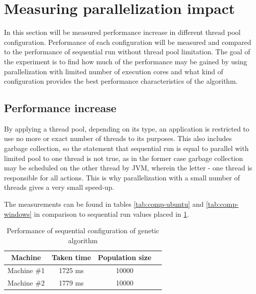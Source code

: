 \section{Measuring parallelization impact}

In this section will be measured performance increase in different thread pool configuration.
Performance of each configuration will be measured and compared to the performance of sequential run without thread pool limitation. The goal of the experiment is to find how much of the performance may be gained by using parallelization with limited number of execution cores and  what kind of configuration provides the best performance characteristics of the algorithm.

\subsection{Performance increase}

By applying a thread pool, depending on its type, an application is restricted to use no more or exact number of threads to its purposes. This also includes garbage collection, so the statement that sequential run is equal to parallel with limited pool to one thread is not true, as in the former case garbage collection may be scheduled on the other thread by JVM, wherein the letter - one thread is responsible for all actions. This is why parallelization with a small number of threads gives a very small speed-up.

The measurements can be found in tables \ref{tab:comp-ubuntu} and \ref{tab:comp-windows} in comparison to sequential run values placed in \ref{tab:win-ub-perf}.

\begin{table}[h]
\centering\caption{Performance of sequential configuration of genetic algorithm \label{tab:win-ub-perf}}
\begin{tabular}{|c|c|c|c|}
\hline
\textbf{Machine} & \textbf{Taken time} & \textbf{Population size} \\
\hline
Machine \#1 & 1725 ms & 10000 \\
\hline
Machine \#2 & 1779 ms & 10000 \\
\hline
\end{tabular}
\end{table}

